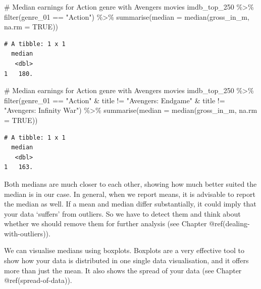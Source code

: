 \documentclass[
  letterpaper,
]{krantz}
\makeatletter
\newenvironment{Shaded}{\begin{snugshade}}{\end{snugshade}}
\newcommand{\AttributeTok}[1]{\textcolor[rgb]{0.40,0.45,0.13}{#1}}
\newcommand{\CommentTok}[1]{\textcolor[rgb]{0.37,0.37,0.37}{#1}}
\newcommand{\ConstantTok}[1]{\textcolor[rgb]{0.56,0.35,0.01}{#1}}
\newcommand{\FunctionTok}[1]{\textcolor[rgb]{0.28,0.35,0.67}{#1}}
\newcommand{\NormalTok}[1]{\textcolor[rgb]{0.00,0.23,0.31}{#1}}
\newcommand{\SpecialCharTok}[1]{\textcolor[rgb]{0.37,0.37,0.37}{#1}}
\newcommand{\StringTok}[1]{\textcolor[rgb]{0.13,0.47,0.30}{#1}}
\newenvironment{kframe}{%
\medskip{}
\setlength{\fboxsep}{.8em}
 \def\at@end@of@kframe{}%
 \ifinner\ifhmode%
  \def\at@end@of@kframe{\end{minipage}}%
  \begin{minipage}{\columnwidth}%
 \fi\fi%
 \def\FrameCommand##1{\hskip\@totalleftmargin \hskip-\fboxsep
 \colorbox{shadecolor}{##1}\hskip-\fboxsep
     \hskip-\linewidth \hskip-\@totalleftmargin \hskip\columnwidth}%
 \MakeFramed {\advance\hsize-\width
   \@totalleftmargin\z@ \linewidth\hsize
   \@setminipage}}%
 {\par\unskip\endMakeFramed%
 \at@end@of@kframe}
\renewenvironment{Shaded}{\begin{kframe}}{\end{kframe}}
\makeatother
\begin{document}
\begin{Shaded}
\begin{Highlighting}[]
\CommentTok{\# Median earnings for Action genre with Avengers movies}
\NormalTok{imdb\_top\_250 }\SpecialCharTok{\%\textgreater{}\%}
  \FunctionTok{filter}\NormalTok{(genre\_01 }\SpecialCharTok{==} \StringTok{"Action"}\NormalTok{) }\SpecialCharTok{\%\textgreater{}\%}
  \FunctionTok{summarise}\NormalTok{(}\AttributeTok{median =} \FunctionTok{median}\NormalTok{(gross\_in\_m, }\AttributeTok{na.rm =} \ConstantTok{TRUE}\NormalTok{))}
\end{Highlighting}
\end{Shaded}

\begin{verbatim}
# A tibble: 1 x 1
  median
   <dbl>
1   180.
\end{verbatim}

\begin{Shaded}
\begin{Highlighting}[]
\CommentTok{\# Median earnings for Action genre with Avengers movies}
\NormalTok{imdb\_top\_250 }\SpecialCharTok{\%\textgreater{}\%}
  \FunctionTok{filter}\NormalTok{(genre\_01 }\SpecialCharTok{==} \StringTok{"Action"} \SpecialCharTok{\&}
\NormalTok{           title }\SpecialCharTok{!=} \StringTok{"Avengers: Endgame"} \SpecialCharTok{\&}
\NormalTok{           title }\SpecialCharTok{!=} \StringTok{"Avengers: Infinity War"}\NormalTok{) }\SpecialCharTok{\%\textgreater{}\%}
  \FunctionTok{summarise}\NormalTok{(}\AttributeTok{median =} \FunctionTok{median}\NormalTok{(gross\_in\_m, }\AttributeTok{na.rm =} \ConstantTok{TRUE}\NormalTok{))}
\end{Highlighting}
\end{Shaded}

\begin{verbatim}
# A tibble: 1 x 1
  median
   <dbl>
1   163.
\end{verbatim}

Both medians are much closer to each other, showing how much better
suited the median is in our case. In general, when we report means, it
is advisable to report the median as well. If a mean and median differ
substantially, it could imply that your data `suffers' from outliers. So
we have to detect them and think about whether we should remove them for
further analysis (see Chapter @ref(dealing-with-outliers)).

We can visualise medians using boxplots. Boxplots are a very effective
tool to show how your data is distributed in one single data
visualisation, and it offers more than just the mean. It also shows the
spread of your data (see Chapter @ref(spread-of-data)).
\end{document}
